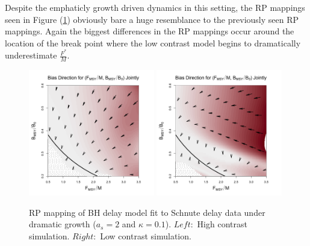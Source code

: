 %

%
Despite the emphaticly growth driven dynamics in this setting, the RP mappings 
seen in Figure (\ref{dramaticGrowth}) obviously bare a huge resemblance to the 
previously seen RP mappings. Again the biggest differences in the RP mappings 
occur around the location of the break point where the low contrast model 
begins to dramatically underestimate $\frac{F^*}{M}$.
\begin{figure}[h!]
\vspace{-1.1cm}
\includegraphics[width=0.49\textwidth]{../ddBias/directionalBiasDDSubExpT45N150A0-1AS2K0.1.png}
\includegraphics[width=0.49\textwidth]{../ddBias/directionalBiasDDSubFlatT45N150A0-1AS2K0.1N84Edge.png}
\vspace{-0.5cm}
\caption{
RP mapping of BH delay model fit to Schnute delay data under dramatic growth ($a_s=2$ and $\kappa=0.1$).
$Left:$ High contrast simulation.
$Right:$ Low contrast simulation.
}\label{dramaticGrowth}
\end{figure}
